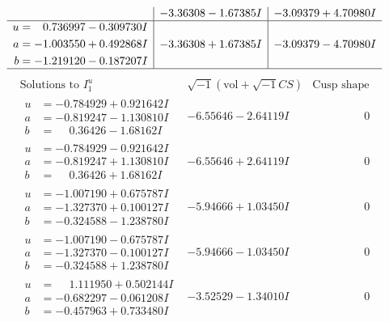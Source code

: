 \documentclass[1p]{elsarticle_modified}
\theoremstyle{definition}
\newcommand{\I}{\sqrt{-1}}
\begin{document}
$$\begin{array}{c|c|c}
 & -3.36308 - 1.67385 I & -3.09379 + 4.70980 I \\ \hline\begin{aligned}
u &= \phantom{-}0.736997 - 0.309730 I \\
a &= -1.003550 + 0.492868 I \\
b &= -1.219120 - 0.187207 I\end{aligned}
 & -3.36308 + 1.67385 I & -3.09379 - 4.70980 I\\
 \hline 
 \end{array}$$\newpage$$\begin{array}{c|c|c}  
\text{Solutions to }I^u_{1}& \I (\text{vol} + \sqrt{-1}CS) & \text{Cusp shape}\\
 \hline 
\begin{aligned}
u &= -0.784929 + 0.921642 I \\
a &= -0.819247 - 1.130810 I \\
b &= \phantom{-}0.36426 - 1.68162 I\end{aligned}
 & -6.55646 - 2.64119 I & \phantom{-0.000000 } 0 \\ \hline\begin{aligned}
u &= -0.784929 - 0.921642 I \\
a &= -0.819247 + 1.130810 I \\
b &= \phantom{-}0.36426 + 1.68162 I\end{aligned}
 & -6.55646 + 2.64119 I & \phantom{-0.000000 } 0 \\ \hline\begin{aligned}
u &= -1.007190 + 0.675787 I \\
a &= -1.327370 + 0.100127 I \\
b &= -0.324588 - 1.238780 I\end{aligned}
 & -5.94666 + 1.03450 I & \phantom{-0.000000 } 0 \\ \hline\begin{aligned}
u &= -1.007190 - 0.675787 I \\
a &= -1.327370 - 0.100127 I \\
b &= -0.324588 + 1.238780 I\end{aligned}
 & -5.94666 - 1.03450 I & \phantom{-0.000000 } 0 \\ \hline\begin{aligned}
u &= \phantom{-}1.111950 + 0.502144 I \\
a &= -0.682297 - 0.061208 I \\
b &= -0.457963 + 0.733480 I\end{aligned}
 & -3.52529 - 1.34010 I & \phantom{-0.000000 } 0 \\ \hline\begin{aligned}

\end{aligned}
\end{array}$$
\end{document}
